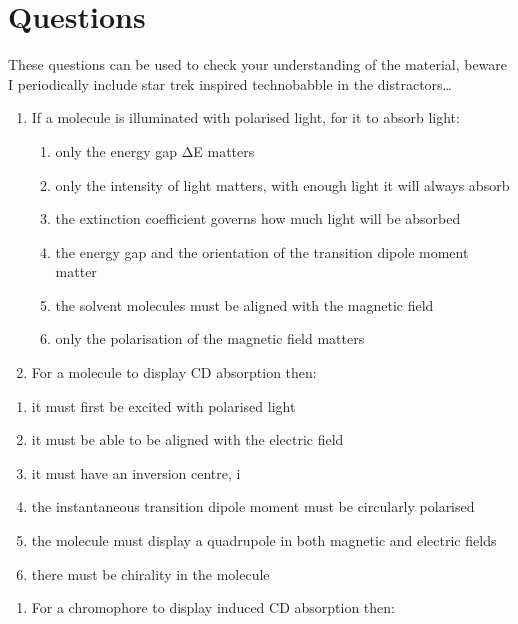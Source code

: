 \documentclass[
]{book}
\providecommand{\tightlist}{%
  \setlength{\itemsep}{0pt}\setlength{\parskip}{0pt}}
\begin{document}
\hypertarget{questions-1}{%
\section{Questions}\label{questions-1}}

These questions can be used to check your understanding of the material, beware I periodically include star trek inspired technobabble in the distractors\ldots{}

\begin{enumerate}
\def\labelenumi{\arabic{enumi}.}
\item
  If a molecule is illuminated with polarised light, for it to absorb light:

  \begin{enumerate}
  \def\labelenumii{\alph{enumii}.}
  \tightlist
  \item
    only the energy gap ΔE matters
  \item
    only the intensity of light matters, with enough light it will always absorb
  \item
    the extinction coefficient governs how much light will be absorbed
  \item
    the energy gap and the orientation of the transition dipole moment matter
  \item
    the solvent molecules must be aligned with the magnetic field
  \item
    only the polarisation of the magnetic field matters
  \end{enumerate}
\item
  For a molecule to display CD absorption then:
\end{enumerate}

\begin{enumerate}
\def\labelenumi{\alph{enumi}.}
\tightlist
\item
  it must first be excited with polarised light
\item
  it must be able to be aligned with the electric field
\item
  it must have an inversion centre, i
\item
  the instantaneous transition dipole moment must be circularly polarised
\item
  the molecule must display a quadrupole in both magnetic and electric fields
\item
  there must be chirality in the molecule
\end{enumerate}

\begin{enumerate}
\def\labelenumi{\arabic{enumi}.}
\setcounter{enumi}{2}
\tightlist
\item
  For a chromophore to display induced CD absorption then:
\end{enumerate}
\end{document}
